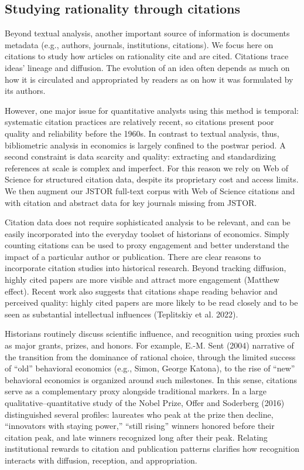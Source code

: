 \documentclass[
]{interact}
\begin{document}
\subsection{Studying rationality through
citations}\label{studying-rationality-through-citations}

Beyond textual analysis, another important source of information is
documents metadata (e.g., authors, journals, institutions, citations).
We focus here on citations to study how articles on rationality cite and
are cited. Citations trace ideas' lineage and diffusion. The evolution
of an idea often depends as much on how it is circulated and
appropriated by readers as on how it was formulated by its authors.

However, one major issue for quantitative analysts using this method is
temporal: systematic citation practices are relatively recent, so
citations present poor quality and reliability before the 1960s. In
contrast to textual analysis, thus, bibliometric analysis in economics
is largely confined to the postwar period. A second constraint is data
scarcity and quality: extracting and standardizing references at scale
is complex and imperfect. For this reason we rely on Web of Science for
structured citation data, despite its proprietary cost and access
limits. We then augment our JSTOR full-text corpus with Web of Science
citations and with citation and abstract data for key journals missing
from JSTOR.

Citation data does not require sophisticated analysis to be relevant,
and can be easily incorporated into the everyday toolset of historians
of economics. Simply counting citations can be used to proxy engagement
and better understand the impact of a particular author or publication.
There are clear reasons to incorporate citation studies into historical
research. Beyond tracking diffusion, highly cited papers are more
visible and attract more engagement (Matthew effect). Recent work also
suggests that citations shape reading behavior and perceived quality:
highly cited papers are more likely to be read closely and to be seen as
substantial intellectual influences (Teplitskiy et al. 2022).

Historians routinely discuss scientific influence, and recognition using
proxies such as major grants, prizes, and honors. For example, E.-M.
Sent (2004) narrative of the transition from the dominance of rational
choice, through the limited success of ``old'' behavioral economics
(e.g., Simon, George Katona), to the rise of ``new'' behavioral
economics is organized around such milestones. In this sense, citations
serve as a complementary proxy alongside traditional markers. In a large
qualitative--quantitative study of the Nobel Prize, Offer and Soderberg
(2016) distinguished several profiles: laureates who peak at the prize
then decline, ``innovators with staying power,'' ``still rising''
winners honored before their citation peak, and late winners recognized
long after their peak. Relating institutional rewards to citation and
publication patterns clarifies how recognition interacts with diffusion,
reception, and appropriation.
\end{document}

